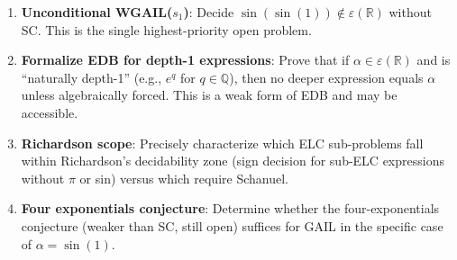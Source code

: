\documentclass[11pt]{article}
\begin{document}
\begin{enumerate}
  \item \textbf{Unconditional WGAIL($s_1$)}: Decide $\sin(\sin(1)) \notin \varepsilon(\mathbb{R})$
    without SC. This is the single highest-priority open problem.

  \item \textbf{Formalize EDB for depth-1 expressions}:
    Prove that if $\alpha \in \varepsilon(\mathbb{R})$ and is ``naturally depth-1''
    (e.g., $e^q$ for $q \in \mathbb{Q}$), then no deeper expression equals $\alpha$
    unless algebraically forced. This is a weak form of EDB and may be accessible.

  \item \textbf{Richardson scope}: Precisely characterize which ELC sub-problems
    fall within Richardson's decidability zone (sign decision for sub-ELC expressions
    without $\pi$ or sin) versus which require Schanuel.

  \item \textbf{Four exponentials conjecture}: Determine whether the four-exponentials
    conjecture (weaker than SC, still open) suffices for GAIL in the specific
    case of $\alpha = \sin(1)$.
\end{enumerate}
\end{document}
